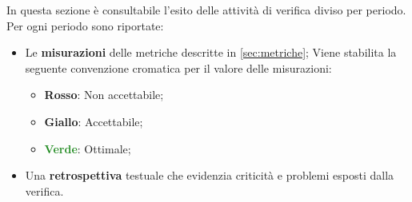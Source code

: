 In questa sezione è consultabile l'esito delle attività di verifica diviso per periodo.\newline
Per ogni periodo sono riportate:
\begin{itemize}
	\item Le \textbf{misurazioni} delle metriche descritte in \cref{sec:metriche}; Viene stabilita la seguente convenzione cromatica per il valore delle misurazioni:
		\begin{itemize}
			\item \textcolor{BrickRed}{\textbf{Rosso}}: Non accettabile;
			\item \textcolor{YellowOrange}{\textbf{Giallo}}: Accettabile;
			\item \textcolor{ForestGreen}{\textbf{Verde}}: Ottimale;
		\end{itemize}
	\item Una \textbf{retrospettiva} testuale che evidenzia criticità e problemi esposti dalla verifica.
\end{itemize}